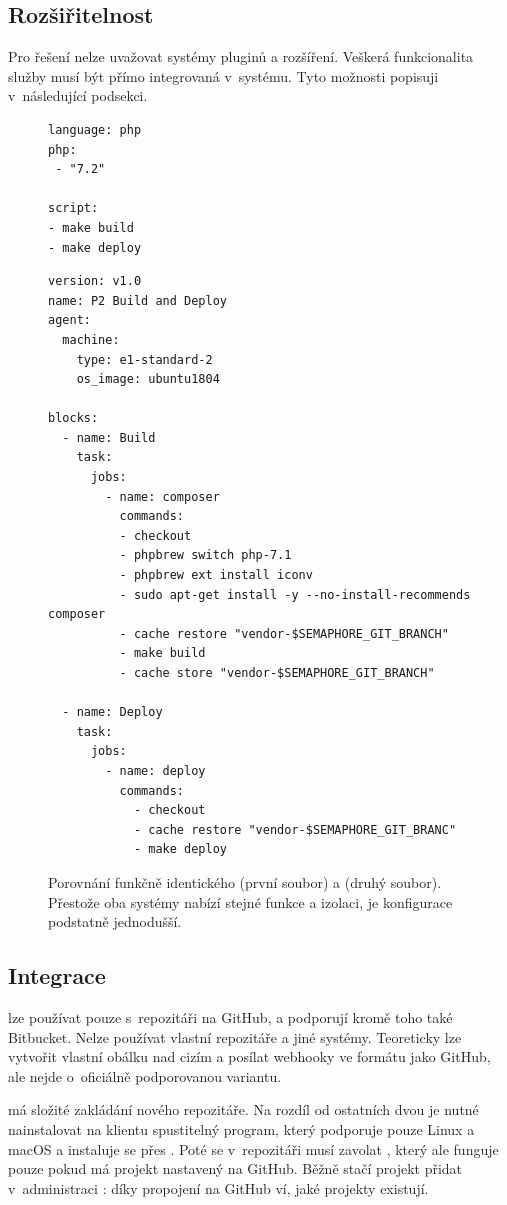     \subsection{Rozšiřitelnost}
        Pro  řešení nelze uvažovat systémy pluginů a rozšíření. Veškerá funkcionalita služby musí být přímo integrovaná v~systému. Tyto možnosti popisuji v~následující podsekci.


    \begin{figure}[H]
        \centering
        \begin{verbatim}
language: php
php:
 - "7.2"

script:
- make build
- make deploy
        \end{verbatim}
        \begin{verbatim}
version: v1.0
name: P2 Build and Deploy
agent:
  machine:
    type: e1-standard-2
    os_image: ubuntu1804

blocks:
  - name: Build
    task:
      jobs:
        - name: composer
          commands:
          - checkout
          - phpbrew switch php-7.1
          - phpbrew ext install iconv
          - sudo apt-get install -y --no-install-recommends composer
          - cache restore "vendor-$SEMAPHORE_GIT_BRANCH"
          - make build
          - cache store "vendor-$SEMAPHORE_GIT_BRANCH"

  - name: Deploy
    task:
      jobs:
        - name: deploy
          commands:
            - checkout
            - cache restore "vendor-$SEMAPHORE_GIT_BRANC"
            - make deploy
        \end{verbatim}
        \caption{Porovnání funkčně identického \travis (první soubor) a \semaphore (druhý soubor). Přestože oba systémy nabízí stejné funkce a izolaci, je konfigurace \travis podstatně jednodušší.}
    \end{figure}

    \newpage
    \subsection{Integrace}
        \travis lze používat pouze s~repozitáři na GitHub, \circleci a \semaphore podporují kromě toho také Bitbucket. Nelze používat vlastní repozitáře a jiné systémy. Teoreticky lze vytvořit vlastní obálku nad cizím  a posílat webhooky ve formátu jako GitHub, ale nejde o~oficiálně podporovanou variantu.

        \semaphore má složité zakládání nového repozitáře. Na rozdíl od ostatních dvou \CI je nutné nainstalovat na klientu spustitelný program, který podporuje pouze Linux a macOS a instaluje se přes . Poté se v~repozitáři musí zavolat , který ale funguje pouze pokud má projekt nastavený  na GitHub. Běžně stačí projekt přidat v~administraci \CI: díky propojení na GitHub \CI ví, jaké projekty existují.

